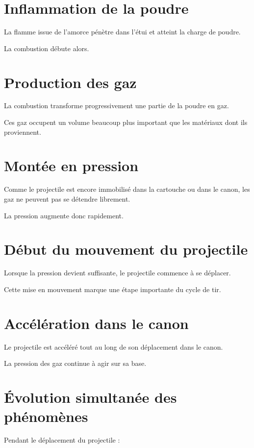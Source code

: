 \section{Inflammation de la poudre}

La flamme issue de l'amorce pénètre dans l'étui et atteint la charge de poudre.

La combustion débute alors.

\section{Production des gaz}

La combustion transforme progressivement une partie de la poudre en gaz.

Ces gaz occupent un volume beaucoup plus important que les matériaux dont ils
proviennent.

\section{Montée en pression}

Comme le projectile est encore immobilisé dans la cartouche ou dans le canon,
les gaz ne peuvent pas se détendre librement.

La pression augmente donc rapidement.

\section{Début du mouvement du projectile}

Lorsque la pression devient suffisante, le projectile commence à se déplacer.

Cette mise en mouvement marque une étape importante du cycle de tir.

\section{Accélération dans le canon}

Le projectile est accéléré tout au long de son déplacement dans le canon.

La pression des gaz continue à agir sur sa base.

\section{Évolution simultanée des phénomènes}

Pendant le déplacement du projectile :


